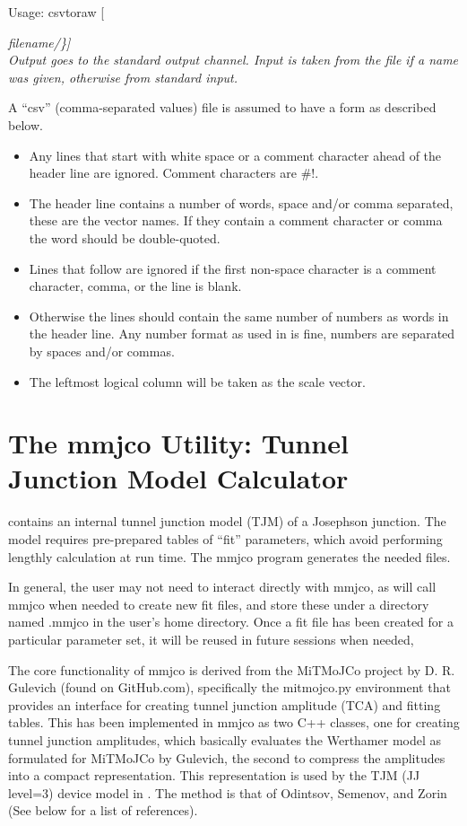Usage:  {\vt csvtoraw} [{\it filename/\}]\\
Output goes to the standard output channel.  Input is taken from the
file if a name was given, otherwise from standard input.

A ``csv'' (comma-separated values) file is assumed to have a form as
described below.
\begin{itemize}
\item{Any lines that start with white space or a comment character
ahead of the header line are ignored.  Comment characters are {\vt *#!}.}
\item{The header line contains a number of words, space and/or comma
separated, these are the vector names.  If they contain a comment
character or comma the word should be double-quoted.}
\item{Lines that follow are ignored if the first non-space character is
a comment character, comma, or the line is blank.}
\item{Otherwise the lines should contain the same number of numbers as
words in the header line.  Any number format as used in {\WRspice}
is fine, numbers are separated by spaces and/or commas.}
\item{The leftmost logical column will be taken as the scale vector.}
\end{itemize}

\section{The {\vt mmjco} Utility: Tunnel Junction Model Calculator}
\label{mmjco}


{\WRspice} contains an internal tunnel junction model (TJM) of a
Josephson junction.  The model requires pre-prepared tables of ``fit''
parameters, which avoid performing lengthly calculation at run time. 
The {\vt mmjco} program generates the needed files.

In general, the user may not need to interact directly with {\vt
mmjco}, as {\WRspice} will call {\vt mmjco} when needed to create new
fit files, and store these under a directory named {\vt .mmjco} in the
user's home directory.  Once a fit file has been created for a
particular parameter set, it will be reused in future {\WRspice}
sessions when needed,

The core functionality of {\vt mmjco} is derived from the MiTMoJCo
project by D.  R.  Gulevich (found on GitHub.com), specifically the
{\vt mitmojco.py} environment that provides an interface for creating
tunnel junction amplitude (TCA) and fitting tables.  This has been
implemented in {\vt mmjco} as two C++ classes, one for creating tunnel
junction amplitudes, which basically evaluates the Werthamer model as
formulated for MiTMoJCo by Gulevich, the second to compress the
amplitudes into a compact representation.  This representation is used
by the TJM (JJ level=3) device model in {\WRspice}.  The method is
that of Odintsov, Semenov, and Zorin (See below for a list of
references).

}
